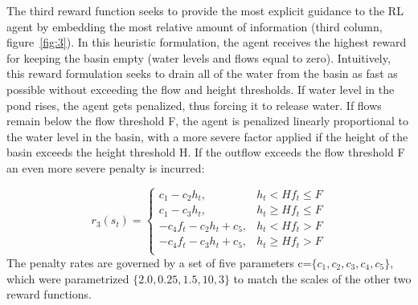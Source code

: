 The third reward function seeks to provide the most explicit guidance to the RL agent by embedding the most relative amount of information (third column, figure~\ref{fig:3}).
In this heuristic formulation, the agent receives the highest reward for keeping the basin empty (water levels and flows equal to zero).
Intuitively, this reward formulation seeks to drain all of the water from the basin as fast as possible without exceeding the flow and height thresholds.
If water level in the pond rises, the agent gets penalized, thus forcing it to release water.
If flows remain below the flow threshold F, the agent is penalized linearly proportional to the water level in the basin, with a more severe factor applied if the height of the basin exceeds the height threshold H. If the outflow exceeds the flow threshold F an even more severe penalty is incurred:

\begin{equation}
r_3 (s_t )= 	\begin{cases}
		c_1-c_2 h_t, & h_t < H  f_t \leq F\\
		c_1-c_3 h_t, & h_t \geq H  f_t \leq F\\
		-c_4 f_t - c_2 h_t + c_5, & h_t < H  f_t > F\\
		-c_4 f_t - c_3 h_t + c_5, & h_t \geq H  f_t > F\\
		\end{cases}
		\label{third}
\end{equation}
The penalty rates are governed by a set of five parameters c=$\{c_1,c_2,c_3,c_4,c_5\}$, which were parametrized $\{2.0, 0.25, 1.5, 10, 3\}$ to match the scales of the other two reward functions.



